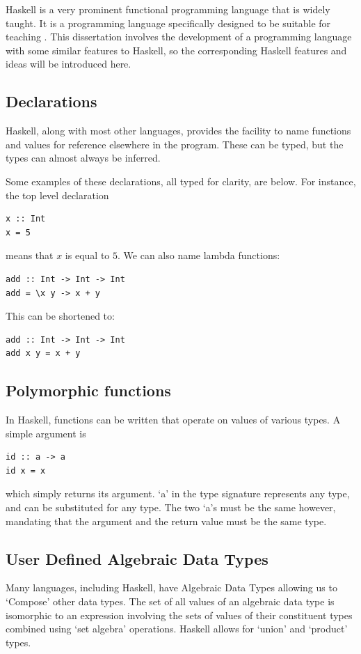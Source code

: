 Haskell is a very prominent functional programming language that is widely taught. It is a programming language specifically designed to be suitable for teaching \cite{hudak2007history}. This dissertation involves the development of a programming language with some similar features to Haskell, so the corresponding Haskell features and ideas will be introduced here. 

\subsection{Declarations}
Haskell, along with most other languages, provides the facility to name functions and values for reference elsewhere in the program. These can be typed, but the types can almost always be inferred. 

Some examples of these declarations, all typed for clarity, are below. For instance, the top level declaration
\begin{verbatim}
x :: Int
x = 5
\end{verbatim}
means that $x$ is equal to $5$. We can also name lambda functions:
\begin{verbatim}
add :: Int -> Int -> Int
add = \x y -> x + y
\end{verbatim}
This can be shortened to:
\begin{verbatim}
add :: Int -> Int -> Int
add x y = x + y
\end{verbatim}

\subsection{Polymorphic functions}
In Haskell, functions can be written that operate on values of various types. A simple argument is 

\begin{verbatim}
id :: a -> a
id x = x
\end{verbatim}
\noindent which simply returns its argument. `a' in the type signature represents any type, and can be substituted for any type. The two `a's must be the same however, mandating that the argument and the return value must be the same type.  

\subsection{User Defined Algebraic Data Types}
\label{bg:haskell_udt}
Many languages, including Haskell, have Algebraic Data Types allowing us to `Compose' other data types. The set of all values of an algebraic data type is isomorphic to an expression involving the sets of values of their constituent types combined using `set algebra' operations. Haskell allows for `union' and `product' types.  

